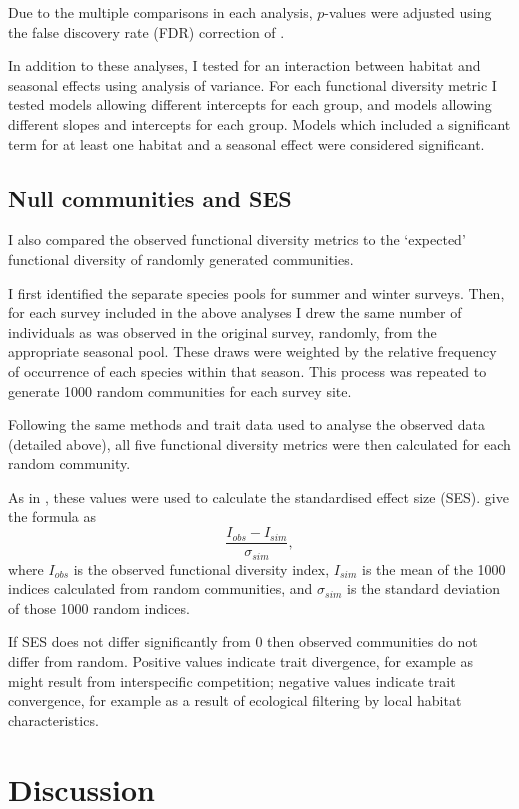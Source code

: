 \documentclass[12pt,a4paper,draft]{book}
\begin{document}
Due to the multiple comparisons in each analysis, $p$-values were adjusted using the false discovery rate (FDR) correction of \cite{Benjamini1995}.

In addition to these analyses, I tested for an interaction between habitat and seasonal effects using analysis of variance. For each functional diversity metric I tested models allowing different intercepts for each group, and models allowing different slopes and intercepts for each group. Models which included a significant term for at least one habitat and a seasonal effect were considered significant.

\subsection{Null communities and SES}

I also compared the observed functional diversity metrics to the `expected' functional diversity of randomly generated communities.

I first identified the separate species pools for summer and winter surveys. Then, for each survey included in the above analyses I drew the same number of individuals as was observed in the original survey, randomly, from the appropriate seasonal pool. These draws were weighted by the relative frequency of occurrence of each species within that season. This process was repeated to generate 1000 random communities for each survey site.

Following the same methods and trait data used to analyse the observed data (detailed above), all five functional diversity metrics were then calculated for each random community.

As in \cite{Mendez2012}, these values were used to calculate the standardised effect size (SES). \cite{Gotelli2002} give the formula as
\begin{equation}
\frac{I_{obs} - I_{sim}}{\sigma_{sim}},
\end{equation}
where $I_{obs}$ is the observed functional diversity index, $I_{sim}$ is the mean of the 1000 indices calculated from random communities, and $\sigma_{sim}$ is the standard deviation of those 1000 random indices.

If SES does not differ significantly from 0 then observed communities do not differ from random. Positive values indicate trait divergence, for example as might result from interspecific competition; negative values indicate trait convergence, for example as a result of ecological filtering by local habitat characteristics.



\section{Discussion}

\printbibliography
\end{document}
